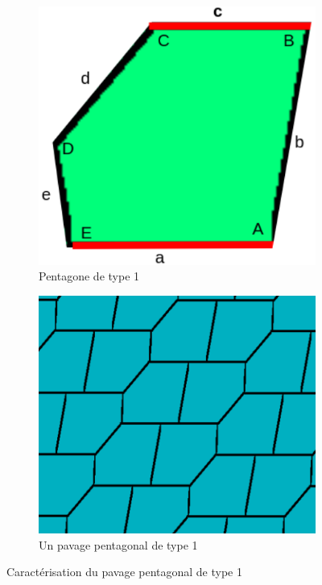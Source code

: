 \documentclass{article}
\begin{document}
\begin{enumerate}
\begin{figure}
    \centering
    \begin{subfigure}{0.44\textwidth}
        \includegraphics[width=\textwidth]{pentType1.png}
        \caption{Pentagone de type 1}
        \label{fig:pent1}
    \end{subfigure}
    \begin{subfigure}{0.44\textwidth}
        \includegraphics[width=\textwidth]{pavagePentType1.png}
        \caption{Un pavage pentagonal de type 1}
        \label{fig:pavage_pent1}
    \end{subfigure}
    \caption{Caractérisation du pavage pentagonal de type 1}
    \label{fig:carpent1}
\end{figure}




\end{enumerate}
\end{document}
